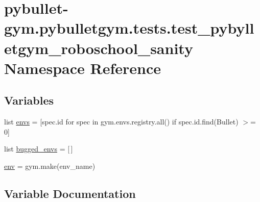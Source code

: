 \hypertarget{namespacepybullet-gym_1_1pybulletgym_1_1tests_1_1test__pybylletgym__roboschool__sanity}{}\section{pybullet-\/gym.pybulletgym.\+tests.\+test\+\_\+pybylletgym\+\_\+roboschool\+\_\+sanity Namespace Reference}
\label{namespacepybullet-gym_1_1pybulletgym_1_1tests_1_1test__pybylletgym__roboschool__sanity}
\subsection*{Variables}
\begin{DoxyCompactItemize}
\item 
list \hyperlink{namespacepybullet-gym_1_1pybulletgym_1_1tests_1_1test__pybylletgym__roboschool__sanity_abc92f2e085bda30f9b8cf033fee2835b}{envs} = \mbox{[}spec.\+id for spec in gym.\+envs.\+registry.\+all() if spec.\+id.\+find(\textquotesingle{}Bullet\textquotesingle{}) $>$= 0\mbox{]}
\item 
list \hyperlink{namespacepybullet-gym_1_1pybulletgym_1_1tests_1_1test__pybylletgym__roboschool__sanity_a9efadcae7097bab774f273e0318b2a03}{bugged\+\_\+envs} = \mbox{[}$\,$\mbox{]}
\item 
\hyperlink{namespacepybullet-gym_1_1pybulletgym_1_1tests_1_1test__pybylletgym__roboschool__sanity_a2cedb6f36ab872b84786c5f13090e017}{env} = gym.\+make(env\+\_\+name)
\end{DoxyCompactItemize}


\subsection{Variable Documentation}
